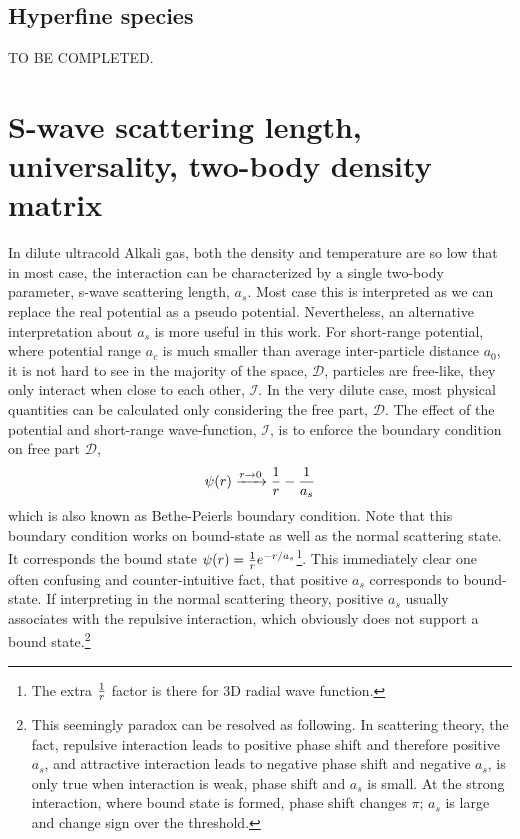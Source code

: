 \subsection{Hyperfine species}
TO BE COMPLETED. 


\section{S-wave scattering length, universality, two-body density matrix\label{sec:intro:as}}
In dilute ultracold Alkali gas, both the density and temperature are so low that in most case, the interaction can be characterized by a single two-body parameter, s-wave scattering length, $a_s$.  Most case this is  interpreted as we can replace the real potential as a pseudo potential\cite{pethick}.  Nevertheless, an alternative interpretation about $a_s$ is more useful in this work\cite{LeggettBEC, Tan2008-1,Tan2008-2,CombescotTan}.  For short-range potential, where potential range $a_c$ is much smaller than average inter-particle distance $a_0$, it is not hard to see in the majority of the space, $\mathcal{D}$, particles are free-like, they only interact when close to each other, $\mathcal{I}$.  In the very dilute case, most physical quantities can be calculated only considering the free part, $\mathcal{D}$.  The effect of the potential and short-range wave-function, $\mathcal{I}$, is to enforce the boundary condition on free part $\mathcal{D}$, 
\begin{equation}\label{eq:intro:Bethe}
\psi(r)\xrightarrow{r\to0}\frac{1}{r}-\frac{1}{a_s}
\end{equation}
which is also known as Bethe-Peierls boundary condition\cite{BethePeierls}.  Note that this boundary condition works on bound-state as well as the normal scattering state.  It corresponds the bound state $\psi(r)=\frac{1}{r}e^{-r/a_s}$\footnote{The extra $\frac{1}{r}$ factor is there for 3D radial wave function.}.  This immediately clear one often confusing and counter-intuitive fact, that positive  $a_s$ corresponds to bound-state.  If interpreting in the normal scattering theory, positive $a_s$  usually associates with the repulsive interaction, which obviously does not support a bound state.\footnote{This seemingly paradox can be resolved as following. In scattering theory, the fact,  repulsive interaction leads to positive phase shift and therefore positive $a_s$, and attractive interaction leads to negative phase shift and negative $a_s$, is only true when interaction is weak, phase shift and $a_s$ is small.  At the strong interaction, where bound state is formed, phase shift changes $\pi$; $a_s$ is large and  change sign over the threshold. }

